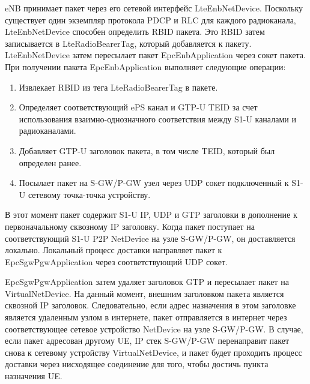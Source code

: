 eNB принимает пакет через его сетевой интерфейс LteEnbNetDevice. 
Поскольку существует один экземпляр протокола PDCP и RLC для каждого радиоканала, LteEnbNetDevice способен определить RBID пакета. 
Это RBID затем записывается в LteRadioBearerTag, который добавляется к пакету. 
LteEnbNetDevice затем пересылает пакет EpcEnbApplication через сокет пакета.
При получении пакета EpcEnbApplication выполняет следующие операции:

\begin{enumerate}
  \item Извлекает RBID из тега LteRadioBearerTag в пакете.
  \item Определяет соответствующий ePS канал и GTP-U TEID за счет использования взаимно-однозначного соответствия между S1-U каналами и радиоканалами.
  \item Добавляет GTP-U заголовок пакета, в том числе TEID, который был определен ранее.
  \item Посылает пакет на S-GW/P-GW узел через UDP сокет подключенный к S1-U сетевому точка-точка устройству.
\end{enumerate}

В этот момент пакет содержит S1-U IP, UDP и GTP заголовки в дополнение к первоначальному сквозному IP заголовку. 
Когда пакет поступает на соответствующий S1-U P2P NetDevice на узле S-GW/P-GW, он доставляется локально. 
Локальный процесс доставки направляет пакет к EpcSgwPgwApplication через соответствующий UDP сокет. 

EpcSgwPgwApplication затем удаляет заголовок GTP и пересылает пакет на VirtualNetDevice. 
На данный момент, внешним заголовком пакета является сквозной IP заголовок. 
Следовательно, если адрес назначения в этом заголовке является удаленным узлом в интернете, пакет отправляется в интернет через соответствующее сетевое устройство NetDevice на узле S-GW/P-GW. 
В случае, если пакет адресован другому UE, IP стек S-GW/P-GW перенаправит пакет снова к сетевому устройству VirtualNetDevice, и пакет будет проходить процесс доставки через нисходящее соединение для того, чтобы достичь пункта назначения UE.


